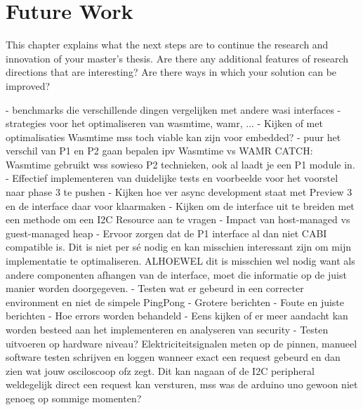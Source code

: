 \chapter*{Future Work}

This chapter explains what the next steps are to continue the research and innovation of your master's thesis. Are there any additional features of research directions that are interesting? Are there ways in which your solution can be improved?


- benchmarks die verschillende dingen vergelijken met andere wasi interfaces
- strategies voor het optimaliseren van wasmtime, wamr, ...
- Kijken of met optimalisaties Wasmtime mss toch viable kan zijn voor embedded?
- puur het verschil van P1 en P2 gaan bepalen ipv Wasmtime vs WAMR CATCH: Wasmtime gebruikt wss sowieso P2 technieken, ook al laadt je een P1 module in.
- Effectief implementeren van duidelijke tests en voorbeelde voor het voorstel naar phase 3 te pushen
- Kijken hoe ver async development staat met Preview 3 en de interface daar voor klaarmaken
- Kijken om de interface uit te breiden met een methode om een I2C Resource aan te vragen
- Impact van host-managed vs guest-managed heap
- Ervoor zorgen dat de P1 interface al dan niet CABI compatible is. Dit is niet per sé nodig en kan misschien interessant zijn om mijn implementatie te optimaliseren. ALHOEWEL dit is misschien wel nodig want als andere componenten afhangen van de interface, moet die informatie op de juist manier worden doorgegeven.
- Testen wat er gebeurd in een correcter environment en niet de simpele PingPong
    - Grotere berichten
    - Foute en juiste berichten
    - Hoe errors worden behandeld
- Eens kijken of er meer aandacht kan worden besteed aan het implementeren en analyseren van security
- Testen uitvoeren op hardware niveau? Elektriciteitsignalen meten op de pinnen, manueel software testen schrijven en loggen wanneer exact een request gebeurd en dan zien wat jouw osciloscoop ofz zegt. Dit kan nagaan of de I2C peripheral weldegelijk direct een request kan versturen, mss was de arduino uno gewoon niet genoeg op sommige momenten?